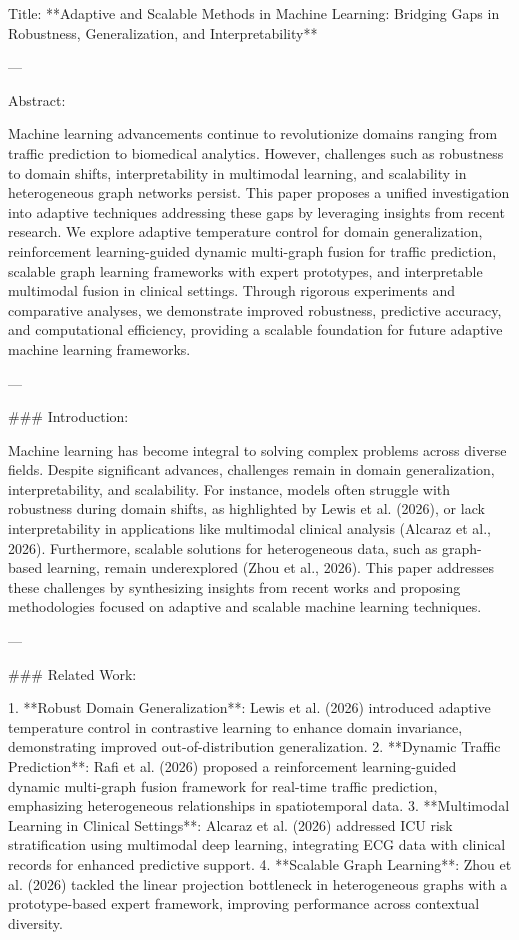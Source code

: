 Title: **Adaptive and Scalable Methods in Machine Learning: Bridging Gaps in Robustness, Generalization, and Interpretability**

---

Abstract:

Machine learning advancements continue to revolutionize domains ranging from traffic prediction to biomedical analytics. However, challenges such as robustness to domain shifts, interpretability in multimodal learning, and scalability in heterogeneous graph networks persist. This paper proposes a unified investigation into adaptive techniques addressing these gaps by leveraging insights from recent research. We explore adaptive temperature control for domain generalization, reinforcement learning-guided dynamic multi-graph fusion for traffic prediction, scalable graph learning frameworks with expert prototypes, and interpretable multimodal fusion in clinical settings. Through rigorous experiments and comparative analyses, we demonstrate improved robustness, predictive accuracy, and computational efficiency, providing a scalable foundation for future adaptive machine learning frameworks.

---

### Introduction:

Machine learning has become integral to solving complex problems across diverse fields. Despite significant advances, challenges remain in domain generalization, interpretability, and scalability. For instance, models often struggle with robustness during domain shifts, as highlighted by Lewis et al. (2026), or lack interpretability in applications like multimodal clinical analysis (Alcaraz et al., 2026). Furthermore, scalable solutions for heterogeneous data, such as graph-based learning, remain underexplored (Zhou et al., 2026). This paper addresses these challenges by synthesizing insights from recent works and proposing methodologies focused on adaptive and scalable machine learning techniques.

---

### Related Work:

1. **Robust Domain Generalization**: Lewis et al. (2026) introduced adaptive temperature control in contrastive learning to enhance domain invariance, demonstrating improved out-of-distribution generalization.
2. **Dynamic Traffic Prediction**: Rafi et al. (2026) proposed a reinforcement learning-guided dynamic multi-graph fusion framework for real-time traffic prediction, emphasizing heterogeneous relationships in spatiotemporal data.
3. **Multimodal Learning in Clinical Settings**: Alcaraz et al. (2026) addressed ICU risk stratification using multimodal deep learning, integrating ECG data with clinical records for enhanced predictive support.
4. **Scalable Graph Learning**: Zhou et al. (2026) tackled the linear projection bottleneck in heterogeneous graphs with a prototype-based expert framework, improving performance across contextual diversity.

